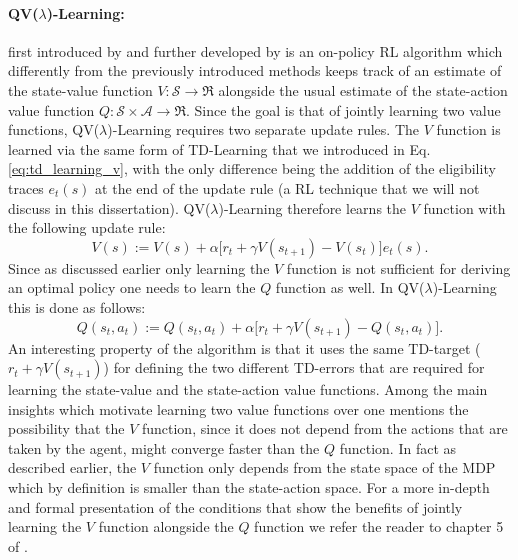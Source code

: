 \paragraph{QV($\lambda$)-Learning:} first introduced by \citet{wiering2005qv} and further developed by \citet{wiering2009qv} is an on-policy RL algorithm which differently from the previously introduced methods keeps track of an estimate of the state-value function $V:\mathcal{S}\rightarrow\Re$ alongside the usual estimate of the state-action value function $Q:\mathcal{S}\times\mathcal{A}\rightarrow\Re$. Since the goal is that of jointly learning two value functions, QV($\lambda$)-Learning requires two separate update rules. The $V$ function is learned via the same form of TD-Learning that we introduced in Eq. \ref{eq:td_learning_v}, with the only difference being the addition of the eligibility traces $e_t(s)$ at the end of the update rule (a RL technique that we will not discuss in this dissertation). QV($\lambda$)-Learning therefore learns the $V$ function with the following update rule:
\begin{equation}
V(s):= V(s) + \alpha \big[ r_{t} + \gamma V(s_{t+1}) - V(s_t) \big] e_{t}(s).
\label{eq:qv_lambda_v_update}
\end{equation}
Since as discussed earlier only learning the $V$ function is not sufficient for deriving an optimal policy one needs to learn the $Q$ function as well. In QV($\lambda$)-Learning this is done as follows:
\begin{equation}
Q(s_{t}, a_{t}):= Q(s_{t}, a_{t}) + \alpha \big[r_{t} + \gamma V(s_{t+1}) - Q(s_{t}, a_{t}) \big].
\label{eq:qv_lambda_q_update}
\end{equation}
An interesting property of the algorithm is that it uses the same TD-target ($r_t + \gamma V(s_{t+1})$) for defining the two different TD-errors that are required for learning the state-value and the state-action value functions. Among the main insights which motivate learning two value functions over one \citet{wiering2005qv} mentions the possibility that the $V$ function, since it does not depend from the actions that are taken by the agent, might converge faster than the $Q$ function. In fact as described earlier, the $V$ function only depends from the state space of the MDP which by definition is smaller than the state-action space. For a more in-depth and formal presentation of the conditions that show the benefits of jointly learning the $V$ function alongside the $Q$ function we refer the reader to chapter 5 of \cite{van2011insights}.


